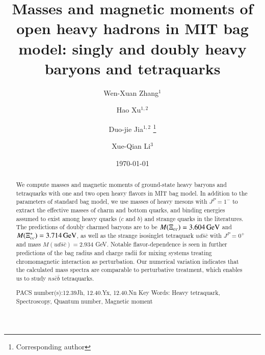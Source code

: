 \documentclass[prd,twocolumn,floatfix,nofootinbib]{revtex4}
\begin{document}
\title{Masses and magnetic moments of open heavy hadrons in MIT bag model:  singly and doubly heavy baryons and tetraquarks}

\author{Wen-Xuan Zhang$^{1}$}
\author{Hao Xu$^{1,2}$}
\author{Duo-jie Jia$^{1,2}$
\footnote{Corresponding author}}
\author{Xue-Qian Li$^{3}$}



\begin{abstract}
We compute masses and magnetic moments of ground-state heavy baryons and tetraquarks with one and two open heavy flavors in MIT bag model. 
In addition to the parameters of standard bag model, we use masses of heavy mesons with $J^{P}=1^{-}$ to extract the effective masses of charm and bottom quarks, and binding energies assumed to exist among heavy quarks ($c$ and $b$) and strange quarks in the literatures. 
The predictions of doubly charmed baryons are to be $M(\Xi_{cc})=3.604\,{\rm GeV}$ and $M(\Xi_{cc}^{\ast})=3.714\,{\rm GeV}$, as well as the strange isosinglet tetraquark $ud\bar{s}\bar{c}$ with $J^{P}=0^{+}$ and mass $M\left(ud\bar{s}\bar{c}\right)=2.934$ GeV. 
Notable flavor-dependence is seen in further predictions of the bag radius and charge radii for mixing systems treating chromomagnetic interaction as perturbation. 
Our numerical variation indicates that the calculated mass spectra are comparable to perturbative treatment, which enables us to study $ns\bar{c}\bar{b}$ tetraquarks.

{\normalsize PACS number(s):12.39Jh, 12.40.Yx, 12.40.Nn}
{\normalsize Key Words: Heavy tetraquark, Spectroscopy, Quantum number, Magnetic moment}
\end{abstract}
\maketitle
\date{\today}
\end{document}
